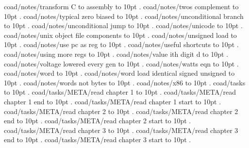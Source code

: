 \smallskip
coad/notes/transform C to assembly \leaders\hbox to 10pt {\hss.\hss}  \hfill {}
\smallskip
coad/notes/twos complement \leaders\hbox to 10pt {\hss.\hss}  \hfill {}
\smallskip
coad/notes/typical zero biased \leaders\hbox to 10pt {\hss.\hss}  \hfill {}
\smallskip
coad/notes/unconditional branch \leaders\hbox to 10pt {\hss.\hss}  \hfill {}
\smallskip
coad/notes/unconditional jump \leaders\hbox to 10pt {\hss.\hss}  \hfill {}
\smallskip
coad/notes/unicode \leaders\hbox to 10pt {\hss.\hss}  \hfill {}
\smallskip
coad/notes/unix object file components \leaders\hbox to 10pt {\hss.\hss}  \hfill {}
\smallskip
coad/notes/unsigned load \leaders\hbox to 10pt {\hss.\hss}  \hfill {}
\smallskip
coad/notes/use pc as reg \leaders\hbox to 10pt {\hss.\hss}  \hfill {}
\smallskip
coad/notes/useful shortcuts \leaders\hbox to 10pt {\hss.\hss}  \hfill {}
\smallskip
coad/notes/using more regs \leaders\hbox to 10pt {\hss.\hss}  \hfill {}
\smallskip
coad/notes/value ith digit d \leaders\hbox to 10pt {\hss.\hss}  \hfill {}
\smallskip
coad/notes/voltage lowered every gen \leaders\hbox to 10pt {\hss.\hss}  \hfill {}
\smallskip
coad/notes/watts eqn \leaders\hbox to 10pt {\hss.\hss}  \hfill {}
\smallskip
coad/notes/word \leaders\hbox to 10pt {\hss.\hss}  \hfill {}
\smallskip
coad/notes/word load identical signed unsigned \leaders\hbox to 10pt {\hss.\hss}  \hfill {}
\smallskip
coad/notes/words not bytes \leaders\hbox to 10pt {\hss.\hss}  \hfill {}
\smallskip
coad/notes/x86 \leaders\hbox to 10pt {\hss.\hss}  \hfill {}
\smallskip
coad/tasks \leaders\hbox to 10pt {\hss.\hss}  \hfill {}
\smallskip
coad/tasks/META/read chapter 1 \leaders\hbox to 10pt {\hss.\hss}  \hfill {}
\smallskip
coad/tasks/META/read chapter 1 end \leaders\hbox to 10pt {\hss.\hss}  \hfill {}
\smallskip
coad/tasks/META/read chapter 1 start \leaders\hbox to 10pt {\hss.\hss}  \hfill {}
\smallskip
coad/tasks/META/read chapter 2 \leaders\hbox to 10pt {\hss.\hss}  \hfill {}
\smallskip
coad/tasks/META/read chapter 2 end \leaders\hbox to 10pt {\hss.\hss}  \hfill {}
\smallskip
coad/tasks/META/read chapter 2 start \leaders\hbox to 10pt {\hss.\hss}  \hfill {}
\smallskip
coad/tasks/META/read chapter 3 \leaders\hbox to 10pt {\hss.\hss}  \hfill {}
\smallskip
coad/tasks/META/read chapter 3 end \leaders\hbox to 10pt {\hss.\hss}  \hfill {}
\smallskip
coad/tasks/META/read chapter 3 start \leaders\hbox to 10pt {\hss.\hss}  \hfill {}
